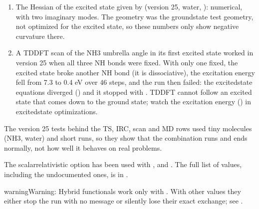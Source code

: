 \documentclass[letterpaper,10pt,english,openany,oneside]{sphinxmanual}
\begin{document}
\begin{enumerate}
\item {} 
\sphinxAtStartPar
The Hessian of the excited state given by  (version 25, water, ): numerical, with two
imaginary modes. The geometry was the ground\sphinxhyphen{}state test geometry, not optimized for the excited state, so these
numbers only show negative curvature there. 

\item {} 
\sphinxAtStartPar
A TDDFT scan of the NH3 umbrella angle in its first excited state worked in version 25 when all three N\textendash{}H
bonds were fixed. With only one fixed, the excited state broke another N\textendash{}H bond (it is dissociative), the
excitation energy fell from 7.3 to 0.4 eV over 46 steps, and the run then failed: the excited\sphinxhyphen{}state equations
diverged () and it stopped with . TDDFT cannot follow an excited state that comes
down to the ground state; watch the excitation energy () in excited\sphinxhyphen{}state optimizations.



\end{enumerate}

\sphinxAtStartPar
The version 25 tests behind the TS, IRC, scan and MD rows used tiny molecules (NH3, water) and short runs, so they
show that the combination runs and ends normally, not how well it behaves on real problems.



\sphinxAtStartPar
The scalar\sphinxhyphen{}relativistic option  has been used with ,  and . The full list of 
values, including the undocumented ones, is in {\hyperref[\detokenize{reference/control:control-theory}]{}}.



\begin{sphinxadmonition}{warning}{Warning:}
\sphinxAtStartPar
Hybrid functionals work only with . With other  values they either stop the run with no
message or silently lose their exact exchange; see {\hyperref[\detokenize{troubleshooting/common-problems:troubleshooting-hybrid}]{}}.
\end{sphinxadmonition}
\end{document}
